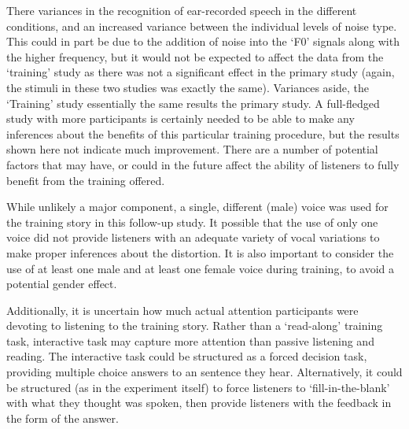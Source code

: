 There \DIFdelbegin {}\DIFdelend \DIFaddbegin {}\DIFaddend variances in the recognition of ear-recorded speech in the different conditions, and an increased variance between the individual levels of noise type.  This could in part be due to the addition of noise into the `F0' signals along with the higher frequency, but it would not be expected to affect the data from the `training' study as there was not a significant effect in the primary study (again, the stimuli in these two studies was exactly the same).  Variances aside, the `Training' study \DIFdelbegin {}\DIFdelend \DIFaddbegin {}\DIFaddend essentially the same results \DIFaddbegin {}\DIFaddend the primary study.  A full-fledged study with more participants is certainly needed to be able to make any inferences about the benefits of this particular training procedure, but the results shown here \DIFdelbegin {}\DIFdelend \DIFaddbegin {}\DIFaddend not indicate much improvement.  There are a number of potential factors that may have, or could in the future affect the ability of listeners to fully benefit from the training offered.  

While unlikely a major component, a single, different (male) voice was used for the training story in this follow-up study.  It \DIFdelbegin {}\DIFdelend \DIFaddbegin {}\DIFaddend possible that the use of only one voice did not provide listeners with an adequate variety of vocal variations to make proper inferences about the distortion.  It is also important to consider the use of at least one male and at least one female voice during training, to avoid a potential gender effect.

Additionally, \DIFdelbegin {}\DIFdelend \DIFaddbegin {}\DIFaddend it is uncertain how much actual attention participants were devoting to listening to the training story.  Rather than a `read-along' training task, \DIFdelbegin {}\DIFdelend \DIFaddbegin {}\DIFaddend interactive task may capture more attention than passive listening and reading.  The interactive task could be structured as a forced decision task, providing multiple choice answers to an \DIFdelbegin {}\DIFdelend \DIFaddbegin {}\DIFaddend sentence they hear.  Alternatively, it could be structured (as in the experiment itself) to force listeners to `fill-in-the-blank' with what they thought was spoken, then provide listeners with the feedback in the form of the answer.  

